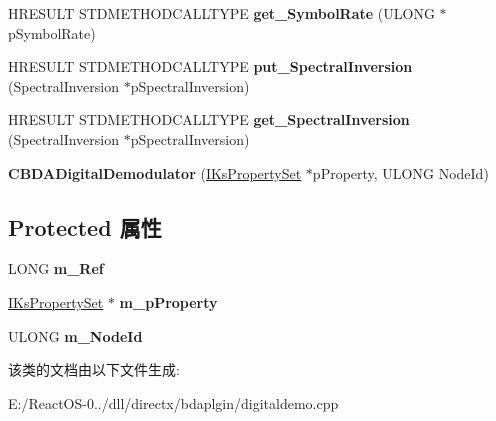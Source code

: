 \begin{DoxyCompactItemize}
\item 
\mbox{\label{class_c_b_d_a_digital_demodulator_a9fc5f0a0f039900e119de100fb16518b}} 
H\+R\+E\+S\+U\+LT S\+T\+D\+M\+E\+T\+H\+O\+D\+C\+A\+L\+L\+T\+Y\+PE {\bfseries get\+\_\+\+Symbol\+Rate} (U\+L\+O\+NG $\ast$p\+Symbol\+Rate)
\item 
\mbox{\label{class_c_b_d_a_digital_demodulator_ac124d10afbc13c54a144cdbc9db3c2ff}} 
H\+R\+E\+S\+U\+LT S\+T\+D\+M\+E\+T\+H\+O\+D\+C\+A\+L\+L\+T\+Y\+PE {\bfseries put\+\_\+\+Spectral\+Inversion} (Spectral\+Inversion $\ast$p\+Spectral\+Inversion)
\item 
\mbox{\label{class_c_b_d_a_digital_demodulator_ab9c6793ff7e969b872d25b211cd13033}} 
H\+R\+E\+S\+U\+LT S\+T\+D\+M\+E\+T\+H\+O\+D\+C\+A\+L\+L\+T\+Y\+PE {\bfseries get\+\_\+\+Spectral\+Inversion} (Spectral\+Inversion $\ast$p\+Spectral\+Inversion)
\item 
\mbox{\label{class_c_b_d_a_digital_demodulator_adda5c2c628b919884a9c27debb13cb38}} 
{\bfseries C\+B\+D\+A\+Digital\+Demodulator} (\hyperlink{interface_i_ks_property_set}{I\+Ks\+Property\+Set} $\ast$p\+Property, U\+L\+O\+NG Node\+Id)
\end{DoxyCompactItemize}
\subsection*{Protected 属性}
\begin{DoxyCompactItemize}
\item 
\mbox{\label{class_c_b_d_a_digital_demodulator_a338c7d986b57adafb7ee39ad68f877e7}} 
L\+O\+NG {\bfseries m\+\_\+\+Ref}
\item 
\mbox{\label{class_c_b_d_a_digital_demodulator_a60b96d0fb53b4a592a183336d1bb277e}} 
\hyperlink{interface_i_ks_property_set}{I\+Ks\+Property\+Set} $\ast$ {\bfseries m\+\_\+p\+Property}
\item 
\mbox{\label{class_c_b_d_a_digital_demodulator_a3a6be087790ca8a5fa6dbf7f5bb1478a}} 
U\+L\+O\+NG {\bfseries m\+\_\+\+Node\+Id}
\end{DoxyCompactItemize}


该类的文档由以下文件生成\+:\begin{DoxyCompactItemize}
\item 
E\+:/\+React\+O\+S-\/0../dll/directx/bdaplgin/digitaldemo.\+cpp\end{DoxyCompactItemize}
